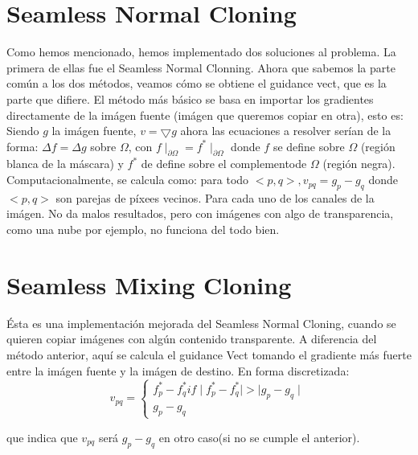 \documentclass[oneside]{article}
\begin{document}
\section{Seamless Normal Cloning}
Como hemos mencionado, hemos implementado dos soluciones al problema. La primera de ellas fue el Seamless Normal Clonning.
Ahora que sabemos la parte común a los dos métodos, veamos cómo se obtiene el guidance vect, que es la parte que difiere. \newline
El método más básico se basa en importar los gradientes directamente de la imágen fuente (imágen que queremos copiar en otra), esto es:
Siendo $g$ la imágen fuente, $v= \bigtriangledown g $ ahora las ecuaciones a resolver serían de la forma:
$\Delta f=\Delta g$  sobre $\Omega$, con $f\mid_{\partial \Omega}=f^{*}\mid_{\partial\Omega}$ donde $f$ se define sobre $\Omega$ (región blanca de la máscara)
y $f^{*}$ de define sobre el complementode $\Omega$ (región negra). \newline
Computacionalmente, se calcula como: \newline
para todo $<p,q>,v_{pq} =g_{p}-g_{q}$ donde $<p,q>$ son parejas de píxees vecinos. Para cada uno de los canales de la imágen. \newline
No da malos resultados, pero con imágenes con algo de transparencia, como una nube por ejemplo, no funciona del todo bien.

\section{Seamless Mixing Cloning}
Ésta es una implementación mejorada del Seamless Normal Cloning, cuando se quieren copiar imágenes con algún contenido transparente.
A diferencia del método anterior, aquí se calcula el guidance Vect tomando el gradiente más fuerte entre la imágen fuente y la imágen de destino.
En forma discretizada: \newline
\[v_{pq}=\left\{\begin{matrix} f^{*}_{p}-f^{*}_{q} if \mid f^{*}_{p}-f^{*}_{q}\mid > \mid g_{p}-g_{q} \mid \\ g_{p}-g_{q} \end{matrix}\right.\]

que indica que $v_{pq}$ será $g_{p}-g_{q}$ en otro caso(si no se cumple el anterior).
\end{document}
